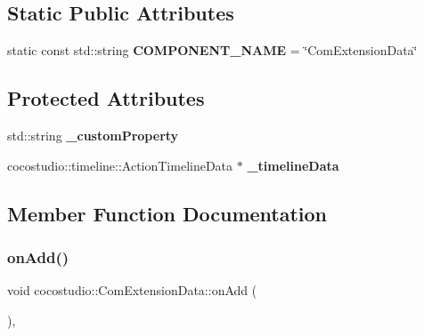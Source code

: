 \subsection*{Static Public Attributes}
\begin{DoxyCompactItemize}
\item 
\mbox{\label{classcocostudio_1_1ComExtensionData_aa53261e6f2453ce3acd47ebb2316dfe1}} 
static const std\+::string {\bfseries C\+O\+M\+P\+O\+N\+E\+N\+T\+\_\+\+N\+A\+ME} = \char`\"{}Com\+Extension\+Data\char`\"{}
\end{DoxyCompactItemize}
\subsection*{Protected Attributes}
\begin{DoxyCompactItemize}
\item 
\mbox{\label{classcocostudio_1_1ComExtensionData_a1fdd477906e23f3442a036b3a5451f7f}} 
std\+::string {\bfseries \+\_\+custom\+Property}
\item 
\mbox{\label{classcocostudio_1_1ComExtensionData_a01e2ff601de9a8296901c4f982283c0c}} 
cocostudio\+::timeline\+::\+Action\+Timeline\+Data $\ast$ {\bfseries \+\_\+timeline\+Data}
\end{DoxyCompactItemize}


\subsection{Member Function Documentation}
\mbox{\label{classcocostudio_1_1ComExtensionData_a4af44abdaf01e9d61ed1018cc174454c}} 
\subsubsection{\texorpdfstring{on\+Add()}{onAdd()}\hspace{0.1cm}{\footnotesize\ttfamily [1/2]}}
{\footnotesize\ttfamily void cocostudio\+::\+Com\+Extension\+Data\+::on\+Add (\begin{DoxyParamCaption}{ }\end{DoxyParamCaption})\hspace{0.3cm}{\ttfamily [override]}, {\ttfamily [virtual]}}

